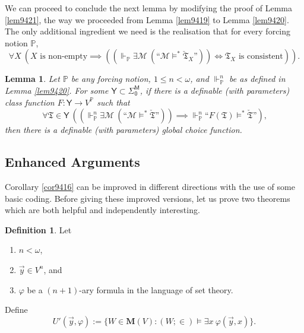 \documentclass[12pt, twoside]{memoir}
\numberwithin{equation}{section}
\newtheorem{lem}[thm]{Lemma}
\theoremstyle{definition}
\newtheorem{defi}[thm]{Definition}
\theoremstyle{remark}
\theoremstyle{definition}
\theoremstyle{definition}
\theoremstyle{definition}
\theoremstyle{remark}
\begin{document}
We can proceed to conclude the next lemma by modifying the proof of Lemma \ref{lem9421}, the way we proceeded from Lemma \ref{lem9419} to Lemma \ref{lem9420}. The only additional ingredient we need is the realisation that for every forcing notion $\mathbb{P}$, 
\begin{equation*}
    \forall X \ (X \text{ is non-empty} \implies ((\Vdash_{\mathbb{P}} \exists \mathcal{M} \ (\text{``} \mathcal{M} \models^* \check{\mathfrak{T}}_X \text{''})) \iff \mathfrak{T}_X \text{ is consistent})) \text{.}
\end{equation*}

\begin{lem}\label{lem9422}
Let $\mathbb{P}$ be any forcing notion, $1 \leq n < \omega$, and $\Vdash^n_{\mathbb{P}}$ be as defined in Lemma \ref{lem9420}.
For some $\mathsf{Y} \subset \mathsf{\Sigma^M_0}$, if there is a definable (with parameters) class function $F : \mathsf{Y} \longrightarrow V^{\mathbb{P}}$ such that
\begin{equation*}
    \forall \mathfrak{T} \in \mathsf{Y} \ ((\Vdash^n_{\mathbb{P}} \exists \mathcal{M} \ (\text{``} \mathcal{M} \models^* \check{\mathfrak{T}} \text{''})) \implies \Vdash^n_{\mathbb{P}} \text{``} F(\mathfrak{T}) \models^* \check{\mathfrak{T}} \text{''}) \text{,}
\end{equation*}
then there is a definable (with parameters) global choice function.
\end{lem}

\subsection{Enhanced Arguments}

Corollary \ref{cor9416} can be improved in different directions with the use of some basic coding. Before giving these improved versions, let us prove two theorems which are both helpful and independently interesting.

\begin{defi}
Let 
\begin{enumerate}[label=(\alph*)]
    \item $n < \omega$,
    \item $\Vec{y} \in V^n$, and
    \item $\varphi$ be a $(n + 1)$-ary formula in the language of set theory.
\end{enumerate}
Define 
\begin{equation*}
    U'(\Vec{y}, \varphi) := \{W \in \mathbf{M}(V) : (W; \in) \models \exists x \ \varphi (\Vec{y}, x) \} \text{.}
\end{equation*}
\end{defi}
\end{document}
